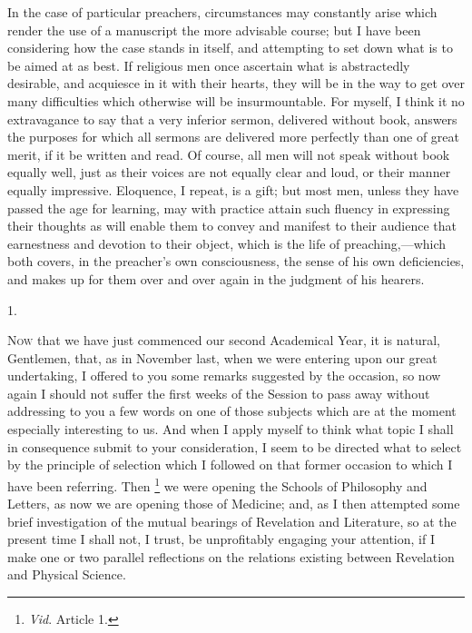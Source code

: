 In the case of particular preachers, circumstances may constantly
arise which render the use of a manuscript the more advisable course;
but I have been considering how the case stands in itself, and
attempting to set down what is to be aimed at as best. If religious
men once ascertain what is abstractedly desirable, and acquiesce in it
with their hearts, they will be in the way to get over many
difficulties which otherwise will be insurmountable. For myself, I
think it no extravagance to say that a very inferior sermon, delivered
without book, answers the purposes for which all sermons are delivered
more perfectly than one of great merit, if it be written and read. Of
course, all men will not speak without book equally well, just as
their voices are not equally clear and loud, or their manner equally
impressive. Eloquence, I repeat, is a gift; but most men, unless they
have passed the age for learning, may with practice attain such
fluency in expressing their thoughts as will enable them to convey and
manifest to their audience that earnestness and devotion to their
object, which is the life of preaching,—which both covers, in the
preacher's own consciousness, the sense of his own deficiencies, and
makes up for them over and over again in the judgment of his hearers.



1.

N\textsc{ow} that we have just commenced our second Academical Year,
it is natural, Gentlemen, that, as in November last, when we were
entering upon our great undertaking, I offered to you some remarks
suggested by the occasion, so now again I should not suffer the first
weeks of the Session to pass away without addressing to you a few
words on one of those subjects which are at the moment especially
interesting to us. And when I apply myself to think what topic I shall
in consequence submit to your consideration, I seem to be directed
what to select by the principle of selection which I followed on that
former occasion to which I have been referring. Then \footnote{\emph{Vid}. Article 1.} we were opening the Schools of Philosophy and Letters, as now
we are opening those of Medicine; and, as I then attempted some brief
investigation of the mutual bearings of Revelation and Literature, so
at the present time I shall not, I trust, be unprofitably engaging
your attention, if I make one or two parallel reflections on the
relations existing between Revelation and Physical Science.

